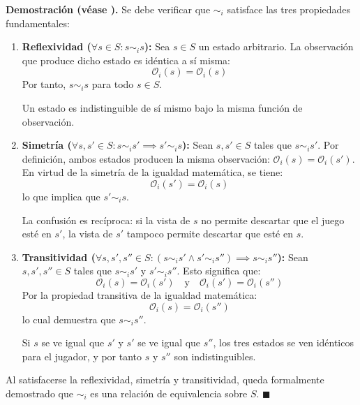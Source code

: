 \vspace{0.5em}
\noindent\textbf{Demostración (véase \cite{OsborneRubinstein1994}).} Se debe verificar que $\sim_i$ satisface las tres propiedades fundamentales:
\begin{enumerate}
    \item \textbf{Reflexividad ($\forall s \in S : s \sim_i s$):}
    Sea $s \in S$ un estado arbitrario. La observación que produce dicho estado es idéntica a sí misma:
    \begin{equation*}
        \mathcal{O}_i(s) = \mathcal{O}_i(s)
    \end{equation*}
    Por tanto, $s \sim_i s$ para todo $s \in S$.
    
Un estado es indistinguible de sí mismo bajo la misma función de observación.
    
    \item \textbf{Simetría ($\forall s, s' \in S : s \sim_i s' \implies s' \sim_i s$):}
    Sean $s, s' \in S$ tales que $s \sim_i s'$. Por definición, ambos estados producen la misma observación: $\mathcal{O}_i(s) = \mathcal{O}_i(s')$. En virtud de la simetría de la igualdad matemática, se tiene:
    \begin{equation*}
        \mathcal{O}_i(s') = \mathcal{O}_i(s)
    \end{equation*}
    lo que implica que $s' \sim_i s$.
    
La confusión es recíproca: si la vista de $s$ no permite descartar que el juego esté en $s'$, la vista de $s'$ tampoco permite descartar que esté en $s$.
    
    \item \textbf{Transitividad ($\forall s, s', s'' \in S : (s \sim_i s' \land s' \sim_i s'') \implies s \sim_i s''$):}
    Sean $s, s', s'' \in S$ tales que $s \sim_i s'$ y $s' \sim_i s''$. Esto significa que:
    \begin{equation*}
        \mathcal{O}_i(s) = \mathcal{O}_i(s') \quad \text{y} \quad \mathcal{O}_i(s') = \mathcal{O}_i(s'')
    \end{equation*}
    Por la propiedad transitiva de la igualdad matemática:
    \begin{equation*}
        \mathcal{O}_i(s) = \mathcal{O}_i(s'')
    \end{equation*}
    lo cual demuestra que $s \sim_i s''$.
    
Si $s$ se ve igual que $s'$ y $s'$ se ve igual que $s''$, los tres estados se ven idénticos para el jugador, y por tanto $s$ y $s''$ son indistinguibles.
\end{enumerate}
Al satisfacerse la reflexividad, simetría y transitividad, queda formalmente demostrado que $\sim_i$ es una relación de equivalencia sobre $S$. \hfill $\blacksquare$
\vspace{0.8em}

